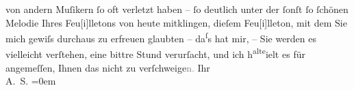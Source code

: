 \begin{ledgroupsized}[t]{13cm}
               von andern Muſikern ſo oft verletzt haben – ſo deutlich unter der ſonſt ſo ſchönen
               Melodie Ihres Feu{[}i{]}lletons von heute
               mitklingen, dieſem Feu{[}i{]}lleton, mit dem Sie mich gewiſs durchaus {\pb}zu erfreuen glaubten – da\substVorne{}\textsuperscript{ſ}\substDazwischen{}s\substHinten{} hat mir, – Sie werden es vielleicht verſtehen, eine bittre Stund verurſacht,
               und ich h\substVorne{}\textsuperscript{alte}\substDazwischen{}ielt\substHinten{} es für angemeſſen, Ihnen das nicht zu verſchweige\textcolor{gray}{n.}\pend
           \pstart
           Ihr {\\[\baselineskip]}\spacefill\mbox{A. S.}\pend
           \leftskip=0em{}
         
         \endnumbering{}\end{ledgroupsized}  \newcommand{\dateiname}{L02988}\newcommand{\titel}{Arthur Schnitzler an Felix Salten, 7. 11. 1903}\newcommand{\editorInnen}{Martin Anton Müller und Laura Untner}
      